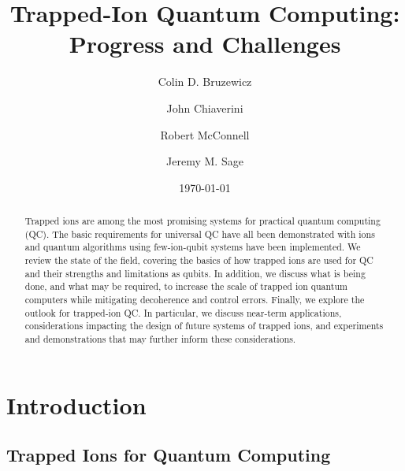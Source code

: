 \documentclass[%
12pt,
 amsmath,amssymb,
]{revtex4-2}
\begin{document}



\title{Trapped-Ion Quantum Computing: Progress and Challenges}
\author{Colin D. Bruzewicz}
\author{John Chiaverini}
\author{Robert McConnell}
\author{Jeremy M. Sage}



\date{\today}

\begin{abstract}
Trapped ions are among the most promising systems for practical quantum computing (QC).  The basic requirements for universal QC have all been demonstrated with ions and quantum algorithms using few-ion-qubit systems have been implemented.  We review the state of the field, covering the basics of how trapped ions are used for QC and their strengths and limitations as qubits.  In addition, we discuss what is being done, and what may be required, to increase the scale of trapped ion quantum computers while mitigating decoherence and control errors.  Finally, we explore the outlook for trapped-ion QC.  In particular, we discuss near-term applications, considerations impacting the design of future systems of trapped ions, and experiments and demonstrations that may further inform these considerations.

\end{abstract}


\maketitle
\tableofcontents
\section{Introduction}
\subsection{Trapped Ions for Quantum Computing}
\end{document}
